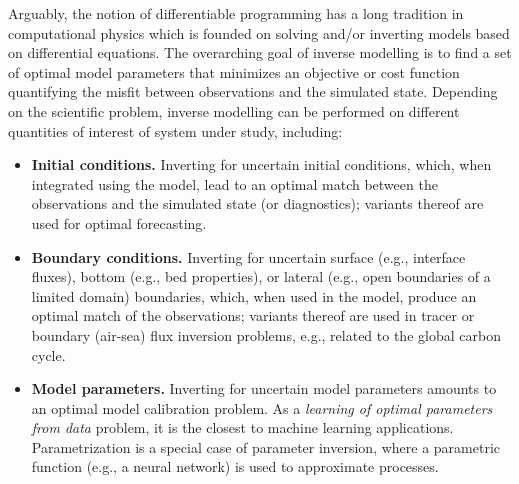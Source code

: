 Arguably, the notion of differentiable programming has a long tradition in computational physics which is founded on solving and/or inverting models based on differential equations.
The overarching goal of inverse modelling is to find a set of optimal model parameters that minimizes an objective or cost function quantifying the misfit between observations and the simulated state.
Depending on the scientific problem, inverse modelling can be performed on different quantities of interest of system under study, including:
\begin{itemize}
    \item \textbf{Initial conditions.} Inverting for uncertain initial conditions, which, when integrated using the model, lead to an optimal match between the observations and the simulated state (or diagnostics); variants thereof are used for optimal forecasting.
    \item \textbf{Boundary conditions.} Inverting for uncertain surface (e.g., interface fluxes), bottom (e.g., bed properties), or lateral (e.g., open boundaries of a limited domain) boundaries, which, when used in the model, produce an optimal match of the observations; variants thereof are used in tracer or boundary (air-sea) flux inversion problems, e.g., related to the global carbon cycle.
    \item \textbf{Model parameters.} Inverting for uncertain model parameters amounts to an optimal model calibration problem. As a \textit{learning of optimal parameters from data} problem, it is the closest to machine learning applications. Parametrization is a special case of parameter inversion, where a parametric function (e.g., a neural network) is used to approximate processes. 
\end{itemize}
